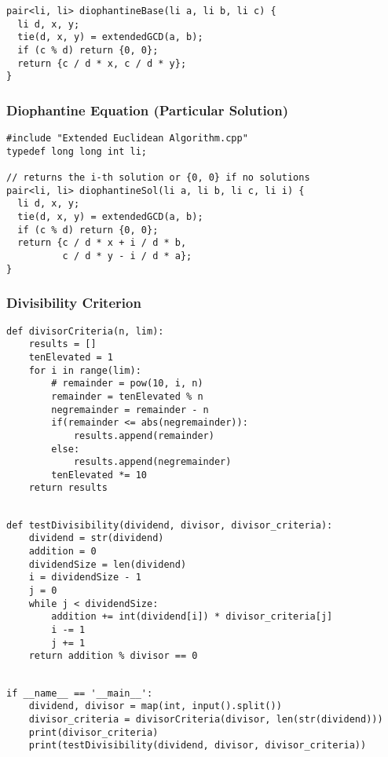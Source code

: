 \documentclass[twoside]{article}
\begin{document}
\begin{multicols*}{2}
\begin{verbatim}
pair<li, li> diophantineBase(li a, li b, li c) {
  li d, x, y;
  tie(d, x, y) = extendedGCD(a, b);
  if (c % d) return {0, 0};
  return {c / d * x, c / d * y};
}
\end{verbatim}

\subsubsectionfont{\large\bfseries\sffamily\underline}
\subsubsection*{Diophantine Equation (Particular Solution)}
\begin{verbatim}
#include "Extended Euclidean Algorithm.cpp"
typedef long long int li;

// returns the i-th solution or {0, 0} if no solutions
pair<li, li> diophantineSol(li a, li b, li c, li i) {
  li d, x, y;
  tie(d, x, y) = extendedGCD(a, b);
  if (c % d) return {0, 0};
  return {c / d * x + i / d * b,
          c / d * y - i / d * a};
}
\end{verbatim}

\subsubsectionfont{\large\bfseries\sffamily\underline}
\subsubsection*{Divisibility Criterion}
\begin{verbatim}
def divisorCriteria(n, lim):
    results = []
    tenElevated = 1
    for i in range(lim):
        # remainder = pow(10, i, n)
        remainder = tenElevated % n
        negremainder = remainder - n
        if(remainder <= abs(negremainder)):
            results.append(remainder)
        else:
            results.append(negremainder)
        tenElevated *= 10
    return results


\end{verbatim}
\vspace{-12pt}
\begin{verbatim}
def testDivisibility(dividend, divisor, divisor_criteria):
    dividend = str(dividend)
    addition = 0
    dividendSize = len(dividend)
    i = dividendSize - 1
    j = 0
    while j < dividendSize:
        addition += int(dividend[i]) * divisor_criteria[j]
        i -= 1
        j += 1
    return addition % divisor == 0


\end{verbatim}
\vspace{-12pt}
\begin{verbatim}
if __name__ == '__main__':
    dividend, divisor = map(int, input().split())
    divisor_criteria = divisorCriteria(divisor, len(str(dividend)))
    print(divisor_criteria)
    print(testDivisibility(dividend, divisor, divisor_criteria))


\end{verbatim}
\end{multicols*}
\end{document}

